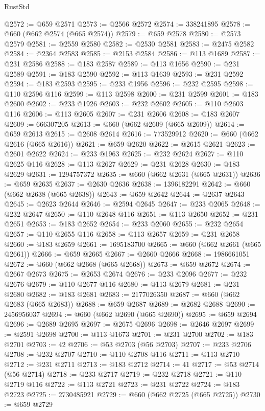 \begin{lexlean}{RustStd}
\begin{coremodule}
{\begin{coremodule}
{{{{{{{{{{{{{{{{{{{{{{{{{{{{{{{{{{{{{{{{{{{{{{{@2572 := @659 @2571
@2573 := @2566 @2572
@2574 := 338241895
@2578 := @660 (@662 @2574 (@665 @2574))
@2579 := @659 @2578
@2580 := @2573 @2579
@2581 := @2559 @2580
@2582 := @2530 @2581
@2583 := @2475 @2582
@2584 := @2364 @2583
@2585 := @2153 @2584
@2586 := @113 @1689
@2587 := @231 @2586
@2588 := @183 @2587
@2589 := @113 @1656
@2590 := @231 @2589
@2591 := @183 @2590
@2592 := @113 @1639
@2593 := @231 @2592
@2594 := @183 @2593
@2595 := @233 @1956
@2596 := @232 @2595
@2598 := @110 @2596 @116
@2599 := @113 @2598
@2600 := @231 @2599
@2601 := @183 @2600
@2602 := @233 @1926
@2603 := @232 @2602
@2605 := @110 @2603 @116
@2606 := @113 @2605
@2607 := @231 @2606
@2608 := @183 @2607
@2609 := 666307205
@2613 := @660 (@662 @2609 (@665 @2609))
@2614 := @659 @2613
@2615 := @2608 @2614
@2616 := 773529912
@2620 := @660 (@662 @2616 (@665 @2616))
@2621 := @659 @2620
@2622 := @2615 @2621
@2623 := @2601 @2622
@2624 := @233 @1963
@2625 := @232 @2624
@2627 := @110 @2625 @116
@2628 := @113 @2627
@2629 := @231 @2628
@2630 := @183 @2629
@2631 := 1294757372
@2635 := @660 (@662 @2631 (@665 @2631))
@2636 := @659 @2635
@2637 := @2630 @2636
@2638 := 1396182291
@2642 := @660 (@662 @2638 (@665 @2638))
@2643 := @659 @2642
@2644 := @2637 @2643
@2645 := @2623 @2644
@2646 := @2594 @2645
@2647 := @233 @2065
@2648 := @232 @2647
@2650 := @110 @2648 @116
@2651 := @113 @2650
@2652 := @231 @2651
@2653 := @183 @2652
@2654 := @233 @2060
@2655 := @232 @2654
@2657 := @110 @2655 @116
@2658 := @113 @2657
@2659 := @231 @2658
@2660 := @183 @2659
@2661 := 1695183700
@2665 := @660 (@662 @2661 (@665 @2661))
@2666 := @659 @2665
@2667 := @2660 @2666
@2668 := 1986661051
@2672 := @660 (@662 @2668 (@665 @2668))
@2673 := @659 @2672
@2674 := @2667 @2673
@2675 := @2653 @2674
@2676 := @233 @2096
@2677 := @232 @2676
@2679 := @110 @2677 @116
@2680 := @113 @2679
@2681 := @231 @2680
@2682 := @183 @2681
@2683 := 2177026350
@2687 := @660 (@662 @2683 (@665 @2683))
@2688 := @659 @2687
@2689 := @2682 @2688
@2690 := 2456956037
@2694 := @660 (@662 @2690 (@665 @2690))
@2695 := @659 @2694
@2696 := @2689 @2695
@2697 := @2675 @2696
@2698 := @2646 @2697
@2699 := @2591 @2698
@2700 := @113 @1673
@2701 := @231 @2700
@2702 := @183 @2701
@2703 := 42
@2706 := @53 @2703 (@56 @2703)
@2707 := @233 @2706
@2708 := @232 @2707
@2710 := @110 @2708 @116
@2711 := @113 @2710
@2712 := @231 @2711
@2713 := @183 @2712
@2714 := 41
@2717 := @53 @2714 (@56 @2714)
@2718 := @233 @2717
@2719 := @232 @2718
@2721 := @110 @2719 @116
@2722 := @113 @2721
@2723 := @231 @2722
@2724 := @183 @2723
@2725 := 2730485921
@2729 := @660 (@662 @2725 (@665 @2725))
@2730 := @659 @2729
}}}}}}}}}}}}}}}}}}}}}}}}}}}}}}}}}}}}}}}}}}}}}}}
\end{coremodule}}
\end{coremodule}
\end{lexlean}
